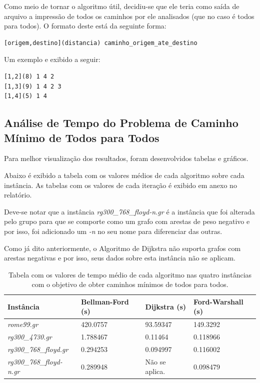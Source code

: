 \documentclass[12pt]{article}
\begin{document}
Como meio de tornar o algoritmo útil, decidiu-se que ele teria como saída de arquivo a impressão de todos os caminhos por ele analisados (que no caso é todos para todos). O formato deste está da seguinte forma:

\begin{verbatim}
[origem,destino](distancia) caminho_origem_ate_destino
\end{verbatim}

Um exemplo e exibido a seguir:

\begin{verbatim}
[1,2](8) 1 4 2
[1,3](9) 1 4 2 3
[1,4](5) 1 4
\end{verbatim}


\subsection{Análise de Tempo do Problema de Caminho Mínimo de Todos para Todos}

Para melhor visualização dos resultados, foram desenvolvidos tabelas e gráficos.

Abaixo é exibido a tabela com os valores médios de cada algoritmo sobre cada instância. As tabelas com os valores de cada iteração é exibido em anexo no relatório.

Deve-se notar que a instância \textit{rg300\_768\_floyd-n.gr} é a instância que foi alterada pelo grupo para que se comporte como um grafo com arestas de peso negativo e por isso, foi adicionado um \textit{-n} no seu nome para diferenciar das outras. 

Como já dito anteriormente, o Algoritmo de Dijkstra não suporta grafos com arestas negativas e por isso, seus dados sobre esta instância não se aplicam.

\begin{table}[H]
	\centering
	\caption{Tabela com os valores de tempo médio de cada algoritmo nas quatro instâncias com o objetivo de obter caminhos mínimos de todos para todos.}
    \begin{tabular}{l|lll}
    \hline
    \textbf{Instância} & \textbf{Bellman-Ford (s)} & \textbf{Dijkstra (s)} & \textbf{Ford-Warshall (s)} \\ \hline \hline
   \textit{ rome99.gr}         & 420.0757                           & 93.59347                          & 149.3292                            \\
   \textit{ rg300\_4730.gr}         & 1.788467                           & 0.11464                          & 0.118966                            \\
   \textit{ rg300\_768\_floyd.gr}         & 0.294253                           & 0.094997                          & 0.116002                            \\
   \textit{ rg300\_768\_floyd-n.gr}    & 0.289948  & Não se aplica.                              & 0.098479                            \\ \hline
    \end{tabular}
\end{table}
\end{document}
